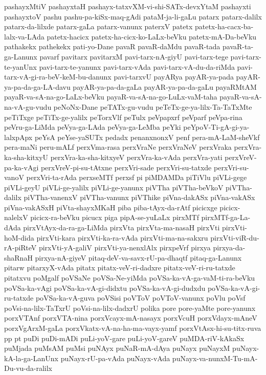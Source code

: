 {pashayxMtiV
pashayxtaH
pashayx-tatxvXM-vi-shi-SATx-devxYtaM
pashayxti
pashayxtoV
pashu
pashu-pa-kiSx-maq-gAdi
pataM-ja-li-gaLu
patarx
patarx-dalilx
patarx-da-lilxde
patarx-gaLa
patarx-vanunx
paterxV
patetx
patetx-ha-cacx-ba-lalx-va-LAda
patetx-hacicx
patetx-ha-cicx-ko-LaLx-beVku
patetx-mA-Da-beVku
pathakekx
pathekekx
pati-yo-Dane
pavaR
pavaR-daMdu
pavaR-tada
pavaR-ta-ga-Lanunx
pavarf
pavitarx
pavitarxM
pavi-tarx-nA-giyU
pavi-tarx-tege
pavi-tarx-te-yanUnx
pavi-tarx-te-yanunx
pavi-tarx-vAda
pavi-tarx-vA-du-da-riMda
pavi-tarx-vA-gi-ra-beV-keM-bu-danunx
pavi-tarxvU
payARya
payAR-ya-pada
payAR-ya-pa-da-ga-LA-davu
payAR-ya-pa-da-gaLa
payAR-ya-pa-da-gaLu
payaRMtAM
payaR-va-sA-na-go-LaLx-beVku
payaR-va-sA-na-go-LuLx-vaM-taha
payaR-va-sA-na-vA-gu-vudu
peNoNx-Dane
peTATx-gu-vudu
peTeTx-ge-ya-lilx-Ta-TaTxMte
peTiTxge
peTiTx-ge-yalilx
peTorxVlf
peTulx
peVpapxrf
peVparf
peVpa-rina
peVru-ga-LiMda
peVya-ga-LAda
peVya-ga-LeMba
peYki
peYpoV-Ti-gA-gi-ya-lalxpApx
peYsA
peYse-yaSUTx
pedadx
penanxnonxV
penf
pera-mA-LaM-sheVkf
pera-maNi
peru-mALf
perxVma-rasa
perxVraNe
perxVraNeV
perxVraka
perxVra-ka-sha-kitxyU
perxVra-ka-sha-kitxyeV
perxVra-ka-vAda
perxVra-yati
perxVreV-pa-ka-vAgi
perxVreV-pi-su-tAtxne
perxVri-sade
perxVri-su-tatxde
perxVri-su-vanoV
perxVri-ta-rAda
perxseMTf
perxsf
pi
piMDAMDa
piTiVlu
piVLi-gege
piVLi-geyU
piVLi-ge-yalilx
piVLi-ge-yanunx
piVTha
piVTha-beVkoV
piVTha-dalilx
piVTha-vanenxV
piVTha-vanunx
piVThike
piVna-dakASx
piVna-vakASx
piVna-vakASxH
piVta-shayxMKaH
piba
piba-tAyx-da-rAtf
picicxge
picicx-nalelxV
picicx-ra-beVku
picucx
piga
pipA-se-yuLaLx
pirxMTf
pirxMTf-ga-La-dAda
pirxVtAyx-da-ra-ga-LiMda
pirxVta
pirxVta-ma-nasaH
pirxVti
pirxVti-hoM-dida
pirxVti-kara
pirxVti-ka-ra-vAda
pirxVti-ma-na-sakxru
pirxVti-viR-du-rA-piRteV
pirxVti-yA-galiV
pirxVti-ya-nenxlAlx
pirxpeVrf
pirxya
pirxya-da-shaRnaH
pirxya-nA-giyeV
pitaq-deV-va-savx-rU-pa-dhaqtf
pitaq-ga-Lanunx
pitarw
pitarxyX-vAda
pitatx
pitatx-veV-ri-dadxre
pitatx-veV-ri-ru-tatxde
pitatxvu
poMgalf
poVSaNe
poVSa-Ne-yiMda
poVSa-ka-vA-ga-vaM-ti-ra-beVku
poVSa-ka-vAgi
poVSa-ka-vA-gi-didxtu
poVSa-ka-vA-gi-dudxdu
poVSa-ka-vA-gi-ru-tatxde
poVSa-ka-vA-guva
poVSisi
poVToV
poVToV-vanunx
poVlu
poVsf
poVsi-na-lilx-TaTxrU
poVsi-na-lilx-dadxrU
polika
pore
pore-yaMte
pore-yanunx
porxVTAnf
porxVTA-nina
porxVcayx-mA-nasayx
porxVcuH
porxVdayx-mAneV
porxVgArxM-gaLa
porxVkatx-vA-na-ha-ma-vayx-yamf
porxVtAsx-hi-su-titx-ruva
pp
pt
puDi
puDi-mADi
puLi-yoV-gare
puLi-yoV-gareV
puMDA-riV-kAkaSx
puMjada
puMsAM
puMsi
puNAyx
puNaR-mA-dAya
puNayx
puNayxM
puNayx-kA-la-ga-LanUnx
puNayx-rU-pa-vAda
puNayx-vAda
puNayx-va-nunxM-Tu-mA-Du-vu-da-ralilx
}
